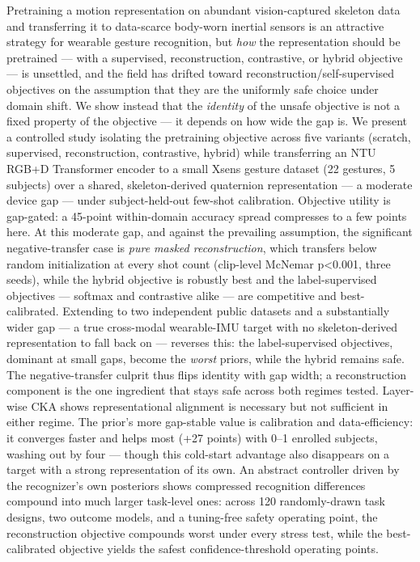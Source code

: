 Pretraining a motion representation on abundant vision-captured skeleton data and transferring it to data-scarce body-worn inertial sensors is an attractive strategy for wearable gesture recognition, but \textit{how} the representation should be pretrained --- with a supervised, reconstruction, contrastive, or hybrid objective --- is unsettled, and the field has drifted toward reconstruction/self-supervised objectives on the assumption that they are the uniformly safe choice under domain shift. We show instead that the \textit{identity} of the unsafe objective is not a fixed property of the objective --- it depends on how wide the gap is. We present a controlled study isolating the pretraining objective across five variants (scratch, supervised, reconstruction, contrastive, hybrid) while transferring an NTU RGB+D Transformer encoder to a small Xsens gesture dataset (22 gestures, 5 subjects) over a shared, skeleton-derived quaternion representation --- a moderate device gap --- under subject-held-out few-shot calibration. Objective utility is gap-gated: a 45-point within-domain accuracy spread compresses to a few points here. At this moderate gap, and against the prevailing assumption, the significant negative-transfer case is \textit{pure masked reconstruction}, which transfers below random initialization at every shot count (clip-level McNemar p<0.001, three seeds), while the hybrid objective is robustly best and the label-supervised objectives --- softmax and contrastive alike --- are competitive and best-calibrated. Extending to two independent public datasets and a substantially wider gap --- a true cross-modal wearable-IMU target with no skeleton-derived representation to fall back on --- reverses this: the label-supervised objectives, dominant at small gaps, become the \textit{worst} priors, while the hybrid remains safe. The negative-transfer culprit thus flips identity with gap width; a reconstruction component is the one ingredient that stays safe across both regimes tested. Layer-wise CKA shows representational alignment is necessary but not sufficient in either regime. The prior's more gap-stable value is calibration and data-efficiency: it converges faster and helps most (+27 points) with 0--1 enrolled subjects, washing out by four --- though this cold-start advantage also disappears on a target with a strong representation of its own. An abstract controller driven by the recognizer's own posteriors shows compressed recognition differences compound into much larger task-level ones: across 120 randomly-drawn task designs, two outcome models, and a tuning-free safety operating point, the reconstruction objective compounds worst under every stress test, while the best-calibrated objective yields the safest confidence-threshold operating points.
